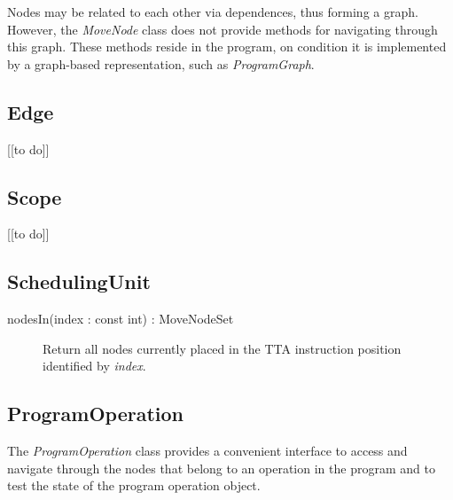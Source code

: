 \documentclass[a4paper,twoside]{tce}
\begin{document}
Nodes may be related to each other via dependences, thus forming a graph.
However, the \emph{MoveNode} class does not provide methods for navigating
through this graph. These methods reside in the program, on condition it is
implemented by a graph-based representation, such as \emph{ProgramGraph}.

\subsection{Edge}
\label{ssec:edge-if}

\begin{description}
\item[{[[to do]]}]
\end{description}

\subsection{Scope}

\begin{description}
\item[{[[to do]]}]
\end{description}

\subsection{SchedulingUnit}
\label{ssec:SchedulingUnit-if}

\begin{description}
\item[nodesIn(index : const int) : MoveNodeSet]%
  Return all nodes currently placed in the TTA instruction position
  identified by \emph{index}.
\end{description}

\subsection{ProgramOperation}
\label{ssec:ProgramOperation-if}

The \emph{ProgramOperation} class provides a convenient interface to access
and navigate through the nodes that belong to an operation in the program
and to test the state of the program operation object.
\end{document}
